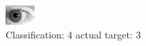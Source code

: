 \begin{figure}[h!]
\begin{center}
\includegraphics[width=0.60\columnwidth]{figures/ID226_class_4_target_3.png}
\end{center}
\caption{ Classification: 4 actual target: 3}
\label{fig:ID226_class_4_target_3}
\end{figure}
